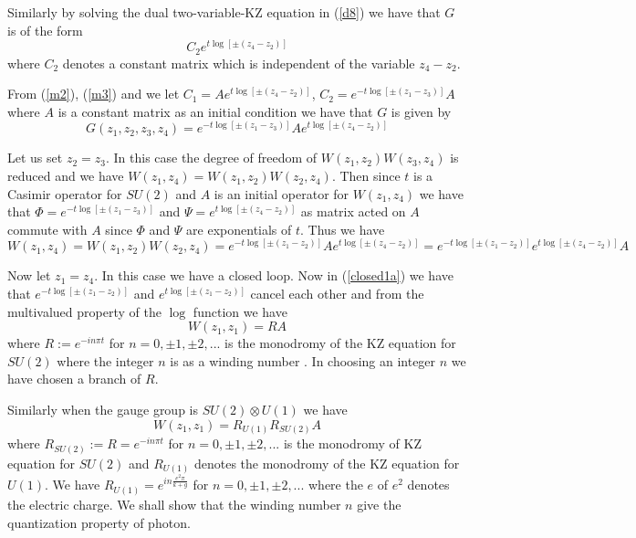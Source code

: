 \documentclass[a4paper,a4paper]{article}
\begin{document}
Similarly by solving the dual two-variable-KZ equation
 in (\ref{d8}) we have that
$G$ is of the form
\begin{equation}
C_2e^{t\log [\pm (z_4-z_2)]}
\label{m3}
\end{equation}
where $C_2$ denotes a constant matrix which is independent
of the variable $z_4-z_2$.

From (\ref{m2}), (\ref{m3}) and we let
$C_1=Ae^{t\log[\pm (z_4-z_2)]}$, 
$C_2= e^{-t\log[\pm (z_1-z_3)]}A$ where $A$ is a constant matrix as an initial condition we have that $G$ is given by
\begin{equation}
G(z_1, z_2, z_3, z_4)=
e^{-t\log [\pm (z_1-z_3)]}Ae^{t\log [\pm (z_4-z_2)]}
\label{m4}
\end{equation}

 

Let us set $z_2=z_3$. In this case the degree of freedom of
$W(z_1, z_2)W(z_3, z_4)$
is reduced and we have 
$W(z_1, z_4)=W(z_1, z_2)W(z_2, z_4)$.
Then since $t$ is a Casimir operator for 
$SU(2)$ and $A$ is an initial operator for $W(z_1,z_4)$ we have that
$\Phi=e^{-t\log [\pm (z_1-z_3)]} $  and $\Psi=e^{t\log [\pm (z_4-z_2)]} $ as matrix acted on $A$ commute with $A$ since  $\Phi $  and $\Psi$ are exponentials of $t$. Thus we have
\begin{equation}
W(z_1, z_4)
=W(z_1, z_2)W(z_2, z_4)
=e^{-t\log [\pm (z_1-z_2)]}Ae^{t\log[\pm (z_4-z_2)]}
=e^{-t\log [\pm (z_1-z_2)]}e^{t\log[\pm (z_4-z_2)]}A
\label{closed1a}
\end{equation}

Now let $z_1=z_4$. In this case we have a closed loop.
Now in (\ref{closed1a})
we have that $e^{-t\log[\pm (z_1-z_2)]}$ and
$e^{t\log [\pm (z_1-z_2)]}$ cancel each other and from the multivalued
property of the
$\log$ function we have
\begin{equation}
W(z_1, z_1)
=RA 
\label{closed2}
\end{equation}
where $R :=e^{-in\pi t}$ for $n=0, \pm 1, \pm 2, ...$ is  the monodromy of the KZ equation for $SU(2)$ where the integer $n$ is as a winding number \cite{Chari}. In choosing an integer $n$ we have chosen a branch of $R$.

Similarly when the gauge group is $SU(2)\otimes U(1)$ we have
\begin{equation}
W(z_1, z_1)
=R_{U(1)}R_{SU(2)}A 
\label{closed21}
\end{equation}
where $R_{SU(2)}:=R =e^{-in\pi t}$ for $n=0, \pm 1, \pm 2, ...$ is  the monodromy of KZ equation for $SU(2)$ and $R_{U(1)}$ denotes the monodromy of the KZ equation for $U(1)$. We have $R_{U(1)}=e^{in\frac{e^2\pi}{k+g}}$
for $n=0, \pm 1, \pm 2, ...$ where the $e$ of $e^2$ denotes the electric charge. We shall show that the winding number $n$ give the quantization property of photon.
\end{document}
